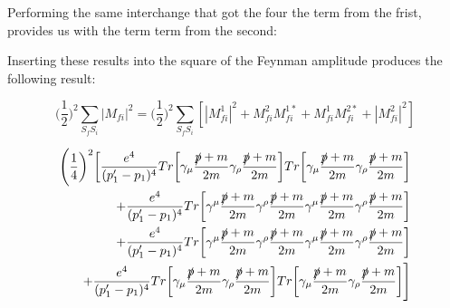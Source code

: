 \documentclass[a4]{article}
\begin{document}
    Performing the same interchange that got the four the term from the frist, provides us with the term term from the second:

    \begin{center}
    \end{center}

    Inserting these results into the square of the Feynman amplitude produces the following result:

    \begin{equation}
        \bigg( \frac{1}{2} \bigg)^2 \sum_{S_f S_i} |M_{f i}|^2 = \bigg( \frac{1}{2} \bigg)^2 \sum_{S_f S_i} [|M_{f i}^1|^2+M_{fi}^2 M_{fi}^{1*} + M_{fi}^1 M_{fi}^{2*} + |M_{f i}^2|^2]
    \end{equation}

    \begin{equation}
        \begin{aligned}
            \Bigg( \frac{1}{4} \bigg)^2 \bigg[ \frac{e^4}{(p'_1 - p_1)^4} Tr \bigg[ \gamma_{\mu} \frac{\slashed{p} + m}{2m} \gamma_{\rho} \frac{\slashed{p} + m}{2m} \bigg] Tr \bigg[ \gamma_{\mu} \frac{\slashed{p} + m}{2m} \gamma_{\rho} \frac{\slashed{p} + m}{2m} \bigg] \\
            + \frac{e^4}{(p'_1 - p_1)^4} Tr \bigg[ \gamma^{\mu} \frac{\slashed{p} + m}{2m} \gamma^{\rho} \frac{\slashed{p} + m}{2m} \gamma^{\mu} \frac{\slashed{p} + m}{2m} \gamma^{\rho} \frac{\slashed{p} + m}{2m} \bigg] \\
            + \frac{e^4}{(p'_1 - p_1)^4} Tr \bigg[ \gamma^{\mu} \frac{\slashed{p} + m}{2m} \gamma^{\rho} \frac{\slashed{p} + m}{2m} \gamma^{\mu} \frac{\slashed{p} + m}{2m} \gamma^{\rho} \frac{\slashed{p} + m}{2m} \bigg] \\
            + \frac{e^4}{(p'_1 - p_1)^4} Tr \bigg[ \gamma_{\mu} \frac{\slashed{p} + m}{2m} \gamma_{\rho} \frac{\slashed{p} + m}{2m} \bigg] Tr \bigg[ \gamma_{\mu} \frac{\slashed{p} + m}{2m} \gamma_{\rho} \frac{\slashed{p} + m}{2m} \bigg] \Bigg]
        \end{aligned}
    \end{equation}
\end{document}
